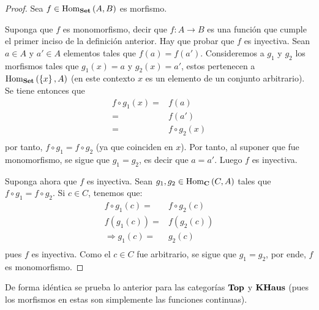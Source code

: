 \documentclass[12pt]{report}
\theoremstyle{largebreak}
\newcommand\cf[3]{\ensuremath{#1:#2\rightarrow#3}}
\newcommand{\Hom}[3]{\ensuremath{\textup{Hom}_{#1}\left(#2,#3\right)}}
\newcommand{\Cat}[1]{\ensuremath{\textup{\textbf{#1}}}}
\begin{document}
    \begin{proof}
        Sea $f\in\Hom{\Cat{Set}}{A}{B}$ es morfismo.

        Suponga que $f$ es monomorfismo, decir que $\cf{f}{A}{B}$ es una función que cumple el primer inciso de la definición anterior. Hay que probar que $f$ es inyectiva. Sean $a\in A$ y $a'\in A$ elementos tales que $f(a)=f(a')$. Consideremos a $g_1$ y $g_2$ los morfismos tales que $g_1(x)=a$ y $g_2(x)=a'$, estos pertenecen a $\Hom{\Cat{Set}}{\left\{x\right\}}{A}$ (en este contexto $x$ es un elemento de un conjunto arbitrario). Se tiene entonces que
        \begin{equation*}
            \begin{split}
                f\circ g_1(x)=&f(a) \\
                =&f(a') \\
                =&f\circ g_2(x) \\
            \end{split}
        \end{equation*}
        por tanto, $f\circ g_1=f\circ g_2$ (ya que coinciden en $x$). Por tanto, al suponer que fue monomorfismo, se sigue que $g_1=g_2$, es decir que $a=a'$. Luego $f$ es inyectiva.

        Suponga ahora que $f$ es inyectiva. Sean $g_1,g_2\in\Hom{\Cat{C}}{C}{A}$ tales que $f\circ g_1 = f\circ g_2$. Si $c\in C$, tenemos que:
        \begin{equation*}
            \begin{split}
                f\circ g_1(c)=&f\circ g_2(c)\\
                f(g_1(c))=&f(g_2(c))\\
                \Rightarrow g_1(c)=&g_2(c)\\
            \end{split}
        \end{equation*}
        pues $f$ es inyectiva. Como el $c\in C$ fue arbitrario, se sigue que $g_1=g_2$, por ende, $f$ es monomorfismo.

    \end{proof}

    De forma idéntica se prueba lo anterior para las categorías $\Cat{Top}$ y $\Cat{KHaus}$ (pues los morfismos en estas son simplemente las funciones continuas).

    \begin{exa}
        
    \end{exa}
\end{document}
